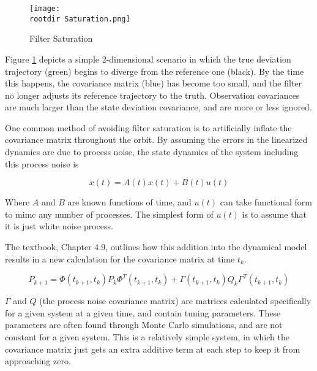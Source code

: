 \documentclass[12pt,a4paper,oneside]{article}
\numberwithin{equation}{section}   		%
\newcommand{\rootdir}{./Figures/}
\newcommand{\figH}[3]{
			\begin{figure}[H]
				\centering
				\texttt{[image: \\rootdir \#1]}
				\caption{#2}
				\label{#3}
			\end{figure}
			}
\begin{document}
\begin{figure}[H]
	\centering
	\texttt{[image: \\rootdir Saturation.png]}
	\cite{5070LEC23}
	\caption{Filter Saturation}
	\label{fig:Saturation}
\end{figure}



Figure \ref{fig:Saturation} depicts a simple 2-dimensional scenario in which the true deviation trajectory (green) begins to diverge from the reference one (black). By the time this happens, the covariance matrix (blue) has become too small, and the filter no longer adjusts its reference trajectory to the truth. Observation covariances are much larger than the state deviation covariance, and are more or less ignored.

One common method of avoiding filter saturation is to artificially inflate the covariance matrix throughout the orbit. By assuming the errors in the linearized dynamics are due to process noise, the state dynamics of the system including this process noise is

\begin{equation}
	\dot{x}(t) =A(t)x(t) + B(t)u(t)
	\label{eq:x Process Noise}
\end{equation}

Where $A$ and $B$ are known functions of time, and $u(t)$ can take functional form to mimc any number of processes. The simplest form of $u(t)$ is to assume that it is just white noise process. 

The textbook, Chapter 4.9, outlines how this addition into the dynamical model results in a new calculation for the covariance matrix at time $t_k$.

\begin{equation}
	\bar{P}_{k+1} = \Phi(t_{k+1},t_k) P_k \Phi^T(t_{k+1},t_k) + \Gamma(t_{k+1},t_k) Q_k \Gamma^T(t_{k+1},t_k) 
	\label{eq:Pbar SNC}
\end{equation}


$\Gamma$ and $Q$ (the process noise covariance matrix) are matrices calculated specifically for a given system at a given time, and contain tuning parameters. These parameters are often found through Monte Carlo simulations, and are not constant for a given system. This is a relatively simple system, in which the covariance matrix just gets an extra additive term at each step to keep it from approaching zero. 
\end{document}

